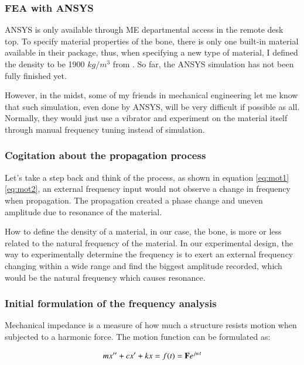 \documentclass{sigchi}
\begin{document}
\subsubsection{FEA with ANSYS} 

ANSYS is only available through ME departmental access in the remote desk top. To specify material properties of the bone, there is only one built-in material available in their package, thus, when specifying a new type of material, I defined the density to be 1900 $kg/m^3$ from \cite{Cameron:1999:Physics}. So far, the ANSYS simulation has not been fully finished yet. 

However, in the midst, some of my friends in mechanical engineering let me know that such simulation, even done by ANSYS, will be very difficult if possible as all. Normally, they would just use a vibrator and experiment on the material itself through manual frequency tuning instead of simulation. 

\subsubsection{Cogitation about the propagation process} 

Let's take a step back and think of the process, as shown in equation \eqref{eq:mot1}\eqref{eq:mot2}, an external frequency input would not observe a change in frequency when propagation. The propagation created a phase change and uneven amplitude due to resonance of the material. 

How to define the density of a material, in our case, the bone, is more or less related to the natural frequency of the material. In our experimental design, the way to experimentally determine the frequency is to exert an external frequency changing within a wide range and find the biggest amplitude recorded, which would be the natural frequency which causes resonance.  

\subsubsection{Initial formulation of the frequency analysis} 

Mechanical impedance is a measure of how much a structure resists motion when subjected to a harmonic force. The motion function can be formulated as:

\begin{equation} \label{eq:mot1}
mx''+cx'+kx=f(t)={\bf F}e^{jwt}
\end{equation}
\end{document}
